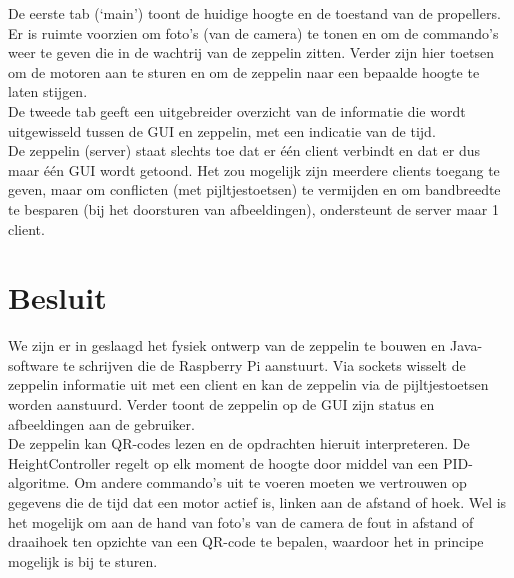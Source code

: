 \documentclass[eind]{penoverslag}
\begin{document}
De eerste tab (`main') toont de huidige hoogte en de toestand van de propellers. Er is ruimte voorzien om foto's (van de camera) te tonen en om de commando's weer te geven die in de wachtrij van de zeppelin zitten. Verder zijn hier toetsen om de motoren aan te sturen en om de zeppelin naar een bepaalde hoogte te laten stijgen.\\

De tweede tab geeft een uitgebreider overzicht van de informatie die wordt uitgewisseld tussen de GUI en zeppelin, met een indicatie van de tijd. \\

De zeppelin (server) staat slechts toe dat er \'e\'en client verbindt en dat er dus maar \'e\'en GUI wordt getoond. Het zou mogelijk zijn meerdere clients toegang te geven, maar om conflicten (met pijltjestoetsen) te vermijden en om bandbreedte te besparen (bij het doorsturen van afbeeldingen), ondersteunt de server maar 1 client. \\




\section{Besluit}
We zijn er in geslaagd het fysiek ontwerp van de zeppelin te bouwen en Java-software te schrijven die de Raspberry Pi aanstuurt. Via sockets wisselt de zeppelin informatie uit met een client en kan de zeppelin via de pijltjestoetsen worden aanstuurd. Verder toont de zeppelin op de GUI zijn status en afbeeldingen aan de gebruiker. \\

De zeppelin kan QR-codes lezen en de opdrachten hieruit interpreteren. De HeightController regelt op elk moment de hoogte door middel van een PID-algoritme. Om andere commando's uit te voeren moeten we vertrouwen op gegevens die de tijd dat een motor actief is, linken aan de afstand of hoek. Wel is het mogelijk om aan de hand van foto's van de camera de fout in afstand of draaihoek ten opzichte van een QR-code te bepalen, waardoor het in principe mogelijk is bij te sturen. \\



\newpage\makeappendix
\end{document}
